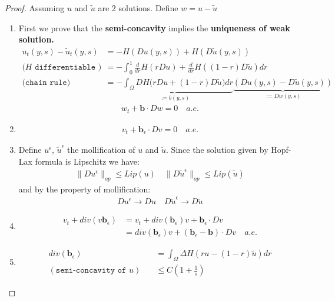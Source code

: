 \begin{proof}\quad
Assuming $u$ and $\tilde{u}$ are 2 solutions. Define $w = u - \tilde{u}$
\begin{enumerate}
	\item First we prove that the \textbf{semi-concavity} implies the \textbf{uniqueness of weak solution.}
	\begin{align*}
	u_t(y, s) - \tilde{u}_t(y, s) 
		&= -H(Du(y, s)) + H(D\tilde{u}(y, s))\\
		\texttt{($H$ differentiable ) }
		&= -\int_0^1 \frac{d}{dr} H(rDu) +  \frac{d}{dr}H( (1-r)D\tilde{u})dr  \\
		\texttt{(chain rule) }
		&= \underbrace{ -\int_\Omega DH\bigg( rDu + (1 - r) D\tilde{u}\bigg)dr}_{:= b(y, s)} \underbrace{ (Du(y, s) - D\tilde{u}(y, s))}_{:= Dw(y, s)}
	\end{align*}
	\begin{align*}
		w_t + \textbf{b} \cdot Dw = 0 \quad a.e.
	\end{align*}
	\item
	\begin{align*}
		v_t + \textbf{b}_\epsilon \cdot Dv = 0 \quad a.e.
	\end{align*}
	\item Define $u^\epsilon$, $\tilde{u}^\epsilon$ the mollification of $u$ and $\tilde{u}$. Since the solution given by Hopf-Lax formula is Lipschitz we have:
	\begin{align*}
		\|D u^\epsilon\|_{op} \le Lip(u) \quad \|D\tilde{u}^\epsilon\|_{op} \le Lip(\tilde{u})
	\end{align*}
	and by the property of mollification:
	\begin{align*}
		Du^\epsilon \rightarrow Du \quad D\tilde{u}^\epsilon \rightarrow D \tilde{u}
	\end{align*}
	\item
	\begin{align*}
		v_t + div(v \textbf{b}_\epsilon) &= v_t + div(\textbf{b}_\epsilon)v + \textbf{b}_\epsilon \cdot D v \\
		&= div(\textbf{b}_\epsilon) v + (\textbf{b}_\epsilon - \textbf{b}) \cdot Dv \quad a.e.
	\end{align*}
	\item 
	\begin{align*}
		div(\textbf{b}_\epsilon)&= 
		\int_\Omega \Delta H(ru - (1 - r) \tilde{u}) dr \\
		(\texttt{semi-concavity of } u)\quad
		&\le C(1 + \frac{1}{s})
	\end{align*}

\end{enumerate}
\end{proof}
